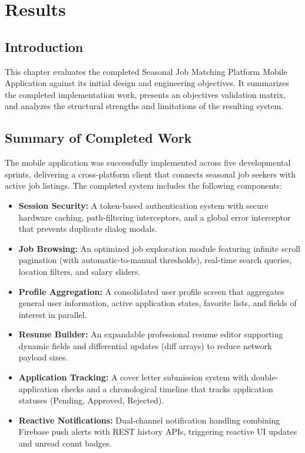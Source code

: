 \chapter{Results}
\label{ch:results}

\section{Introduction}
This chapter evaluates the completed Seasonal Job Matching Platform Mobile Application against its initial design and engineering objectives. It summarizes the completed implementation work, presents an objectives validation matrix, and analyzes the structural strengths and limitations of the resulting system.

\section{Summary of Completed Work}
The mobile application was successfully implemented across five developmental sprints, delivering a cross-platform client that connects seasonal job seekers with active job listings. The completed system includes the following components:
\begin{itemize}
    \item \textbf{Session Security:} A token-based authentication system with secure hardware caching, path-filtering interceptors, and a global error interceptor that prevents duplicate dialog modals.
    \item \textbf{Job Browsing:} An optimized job exploration module featuring infinite scroll pagination (with automatic-to-manual thresholds), real-time search queries, location filters, and salary sliders.
    \item \textbf{Profile Aggregation:} A consolidated user profile screen that aggregates general user information, active application states, favorite lists, and fields of interest in parallel.
    \item \textbf{Resume Builder:} An expandable professional resume editor supporting dynamic fields and differential updates (diff arrays) to reduce network payload sizes.
    \item \textbf{Application Tracking:} A cover letter submission system with double-application checks and a chronological timeline that tracks application statuses (Pending, Approved, Rejected).
    \item \textbf{Reactive Notifications:} Dual-channel notification handling combining Firebase push alerts with REST history APIs, triggering reactive UI updates and unread count badges.
\end{itemize}

